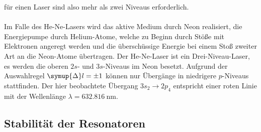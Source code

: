     für einen Laser sind also mehr als zwei Niveaus erforderlich.\\
    \\
    Im Falle des He-Ne-Lasers wird das aktive Medium durch Neon realisiert,
    die Energiepumpe durch Helium-Atome,
    welche zu Beginn durch Stöße mit Elektronen angeregt werden und die überschüssige Energie bei einem Stoß zweiter Art an die Neon-Atome übertragen.
    Der He-Ne-Laser ist ein Drei-Niveau-Laser,
    es werden die oberen $2s$- und $3s$-Niveaus im Neon besetzt.
    Aufgrund der Auswahlregel $\symup{\Delta} l = \pm 1$ können nur Übergänge in niedrigere $p$-Niveaus stattfinden.
    Der hier beobachtete Übergang $3s_2 \to 2p_4$ entspricht einer roten Linie mit der Wellenlänge $\lambda = \SI{632.816}{\nano\meter}$.

\subsection{Stabilität der Resonatoren}
\label{sec:stabilitaet}

